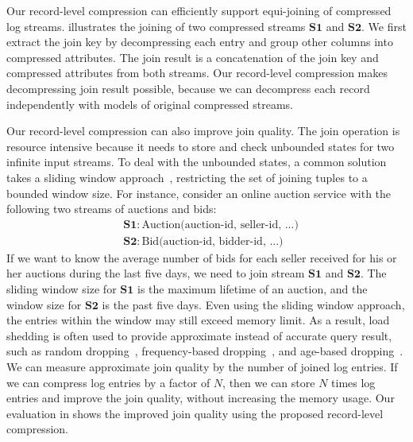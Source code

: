 Our record-level compression can efficiently support equi-joining of compressed log streams.
 illustrates the joining of two compressed streams $\mathbf{S1}$ and $\mathbf{S2}$. We first extract the join key by decompressing each entry and group other columns into compressed attributes. The join result is a concatenation of the join key and compressed attributes from both streams. 
Our record-level compression makes decompressing join result possible, because we can decompress each record independently with models of original compressed streams. 

Our record-level compression can also improve join quality. The join operation is resource intensive because it needs to store and check unbounded states for two infinite input streams. To deal with the unbounded states, a common solution takes a sliding window approach~\cite{Babcock2002}, restricting the set of joining tuples to a bounded window size. 
For instance, consider an online auction service with the following two streams of auctions and bids:
\begin{align}
    & \mathbf{S1}: \text{Auction(auction-id, seller-id, ...)} \nonumber \\
    & \mathbf{S2}: \text{Bid(auction-id, bidder-id, ...)} \nonumber 
\end{align}
If we want to know the average number of bids for each seller received 
for his or her auctions during the last five days, we need to join stream $\mathbf{S1}$ and $\mathbf{S2}$. The sliding window size for $\mathbf{S1}$ is the maximum lifetime of an auction, and the window size for $\mathbf{S2}$ is the past five days. Even using the sliding window approach, the entries within the window may still exceed memory limit. 
As a result, load shedding is often used to provide approximate instead of accurate query result, such as random dropping~\cite{Kang2003}, frequency-based dropping~\cite{Das2003}, and age-based dropping~\cite{Srivastava2004}. 
We can measure approximate join quality by the number of joined log entries. 
If we can compress log entries by a factor of $N$, then we can store $N$ times log entries and improve the join quality, without increasing the memory usage. 
Our evaluation in  shows the improved join quality using the proposed record-level compression.
